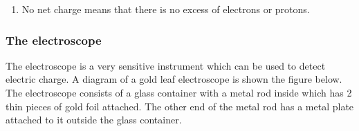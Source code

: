 {\begin{mdframed}[linewidth=4, leftmargin=40, rightmargin=40]
\begin{exercise}
\begin{enumerate}[noitemsep, label=\textbf{Step} \textbf{\arabic*}. ]
\begin{math}\begin{array}{ccc}Q=\frac{{Q}_{1}+{Q}_{2}}{2}\\ \phantom{x}=\frac{9,6\ensuremath{\times}{10}^{-18}+\left(-9,6\ensuremath{\times}{10}^{-18}\right)}{2}\\ \phantom{x}=0\phantom{\rule{2pt}{0ex}}\mathrm{C}\end{array}\end{math}.\newline
     So each sphere is now neutral. \item \newline
    No net charge means that there is no excess of electrons or protons.\end{enumerate}
        


    \end{exercise}
    \end{mdframed}
    }
    \noindent
  \label{m38781*uid11}
            \subsubsection{ The electroscope}
            \nopagebreak
            
        
        \label{m38781*id201715}The electroscope is a very sensitive instrument which can be used to detect electric charge.
A diagram of a gold leaf electroscope is shown the figure below. The electroscope consists of a glass container
with a metal rod inside which has 2 thin pieces of gold foil attached. The other end of the metal rod has a metal plate attached to it outside the glass container.\par 
        \label{m38781*id200543}
          
    \setcounter{subfigure}{0}



